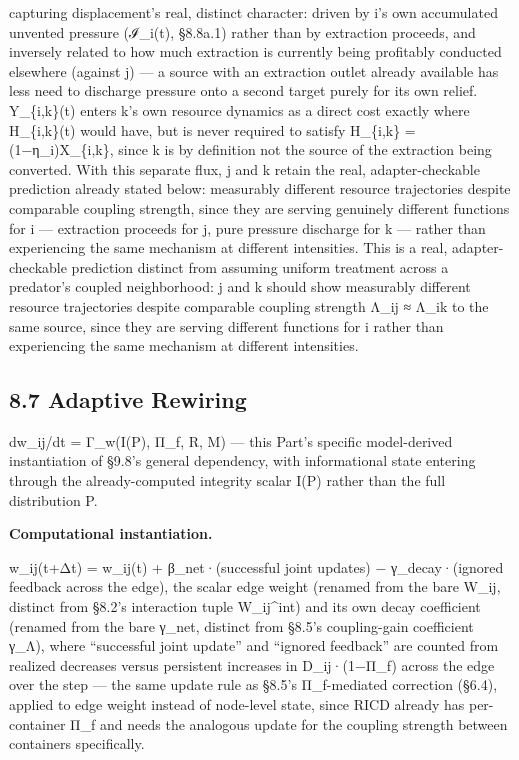 \documentclass[
]{article}
\begin{document}
capturing displacement's real, distinct character: driven by i's own
accumulated unvented pressure (ℐ\_i(t), §8.8a.1) rather than by
extraction proceeds, and inversely related to how much extraction is
currently being profitably conducted elsewhere (against j) --- a source
with an extraction outlet already available has less need to discharge
pressure onto a second target purely for its own relief. Y\_\{i,k\}(t)
enters k's own resource dynamics as a direct cost exactly where
H\_\{i,k\}(t) would have, but is never required to satisfy H\_\{i,k\} =
(1−η\_i)X\_\{i,k\}, since k is by definition not the source of the
extraction being converted. With this separate flux, j and k retain the
real, adapter-checkable prediction already stated below: measurably
different resource trajectories despite comparable coupling strength,
since they are serving genuinely different functions for i ---
extraction proceeds for j, pure pressure discharge for k --- rather than
experiencing the same mechanism at different intensities. This is a
real, adapter-checkable prediction distinct from assuming uniform
treatment across a predator's coupled neighborhood: j and k should show
measurably different resource trajectories despite comparable coupling
strength Λ\_ij ≈ Λ\_ik to the same source, since they are serving
different functions for i rather than experiencing the same mechanism at
different intensities.

\hypertarget{adaptive-rewiring}{%
\subsection{8.7 Adaptive Rewiring}\label{adaptive-rewiring}}

dw\_ij/dt = Γ\_w(I(P), Π\_f, R, M) --- this Part's specific
model-derived instantiation of §9.8's general dependency, with
informational state entering through the already-computed integrity
scalar I(P) rather than the full distribution P.

\textbf{Computational instantiation.}

w\_ij(t+Δt) = w\_ij(t) + β\_net·(successful joint updates) −
γ\_decay·(ignored feedback across the edge), the scalar edge weight
(renamed from the bare W\_ij, distinct from §8.2's interaction tuple
W\_ij\^{}int) and its own decay coefficient (renamed from the bare
γ\_net, distinct from §8.5's coupling-gain coefficient γ\_Λ), where
``successful joint update'' and ``ignored feedback'' are counted from
realized decreases versus persistent increases in D\_ij·(1−Π\_f) across
the edge over the step --- the same update rule as §8.5's Π\_f-mediated
correction (§6.4), applied to edge weight instead of node-level state,
since RICD already has per-container Π\_f and needs the analogous update
for the coupling strength between containers specifically.
\end{document}
